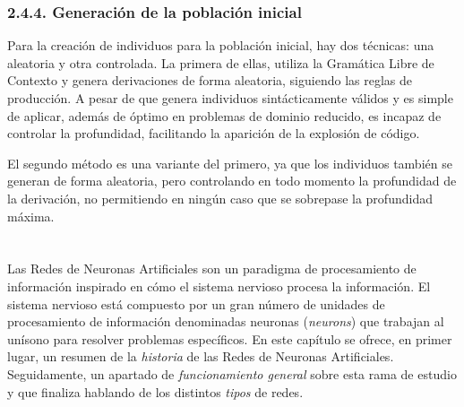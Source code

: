 \documentclass[spanish,a4paper,12pt,twoside]{report}
\begin{document}
    \subsection*{\large 2.4.4. Generación de la población inicial}
    Para la creación de individuos para la población inicial, hay dos técnicas: una aleatoria y otra controlada. La primera de ellas, utiliza la Gramática Libre de Contexto y genera derivaciones de forma aleatoria, siguiendo las reglas de producción. A pesar de que genera individuos sintácticamente válidos y es simple de aplicar, además de óptimo en problemas de dominio reducido, es incapaz de controlar la profundidad, facilitando la aparición de la explosión de código. \par
    El segundo método es una variante del primero, ya que los individuos también se generan de forma aleatoria, pero controlando en todo momento la profundidad de la derivación, no permitiendo en ningún caso que se sobrepase la profundidad máxima. \vfill
    
  \chapter{\vspace{-3cm}{\LARGE 3. Redes de Neuronas Artificiales}}
  \setcounter{figure}{9}
  \vspace{-1cm}
  Las Redes de Neuronas Artificiales son un paradigma de procesamiento de información inspirado en cómo el sistema nervioso procesa la información. El sistema nervioso está compuesto por un gran número de unidades de procesamiento de información denominadas neuronas (\emph{neurons}) que trabajan al unísono para resolver problemas específicos. En este capítulo se ofrece, en primer lugar, un resumen de la \emph{historia} de las Redes de Neuronas Artificiales. Seguidamente, un apartado de \emph{funcionamiento general} sobre esta rama de estudio y que finaliza hablando de los distintos \emph{tipos} de redes.
  
\end{document}

